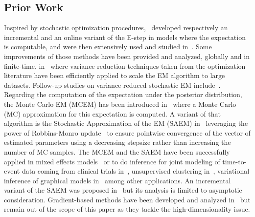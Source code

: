\documentclass[12pt]{article}
\begin{document}
\subsection{Prior Work}
Inspired by stochastic optimization procedures,~\citet{neal1998view,cappe2009line} developed respectively an incremental and an online variant of the {E-step} in models where the expectation is computable, and were then extensively used and studied in~\citet{nguyen2020mini, liang2009online,cappe2011online}.
Some improvements of those methods have been provided and analyzed, globally and in finite-time, in~\citet{karimi2019global} where variance reduction techniques taken from the optimization literature have been efficiently applied to scale the EM algorithm to large datasets. Follow-up studies on variance reduced stochastic EM include~\citet{fortem2020,fort2021geom}.
Regarding the computation of the expectation under the posterior distribution, the Monte Carlo EM (MCEM) has been introduced in~\citet{wei1990monte} where a Monte Carlo (MC) approximation for this expectation is computed. A variant of that algorithm is the Stochastic Approximation of the EM (SAEM) in~\citet{delyon1999} leveraging the power of Robbins-Monro update~\citep{robbins1951stochastic} to ensure pointwise convergence of the vector of estimated parameters using a decreasing stepsize rather than increasing the number of MC samples.
The MCEM and the SAEM have been successfully applied in mixed effects models~\citep{mcculloch1997maximum,hughes1999mixed,baey2016nonlinear} or to do inference for joint modeling of time-to-event data coming from clinical trials in~\citet{das2010Inferences}, unsupervised clustering in~\citet{ngChoice2003}, variational inference of graphical models in~\citet{BleiVariational2017} among other applications.
An incremental variant of the SAEM was proposed in~\citet{kuhn2019properties} but its analysis is limited to asymptotic consideration. 
Gradient-based methods have been developed and analyzed in~\citet{zhu2017high} but remain out of the scope of this paper as they tackle the high-dimensionality issue.
\end{document}
